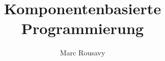 \documentclass[minted]{protocol}
\title{Komponentenbasierte Programmierung}
\author{Marc Rousavy}
\begin{document}


\glsaddall 		%
\end{document}
